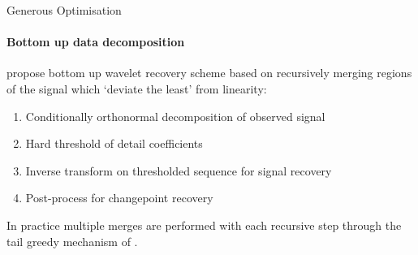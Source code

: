 \documentclass{beamer}
\begin{document}
\begin{frame}{Generous Optimisation}
\framesubtitle{Bottom up data decomposition}

\cite{maeng2019detecting} propose bottom up wavelet recovery scheme based on recursively merging regions of the signal which `deviate the least' from linearity: 

\bigskip

\begin{enumerate}
    \item Conditionally orthonormal decomposition of observed signal
    \item Hard threshold of detail coefficients 
    \item Inverse transform on thresholded sequence for signal recovery 
    \item Post-process for changepoint recovery
\end{enumerate}

\bigskip

In practice multiple merges are performed with each recursive step through the tail greedy mechanism of \cite{fryzlewicz2018tail}.
\end{frame}
\end{document}
